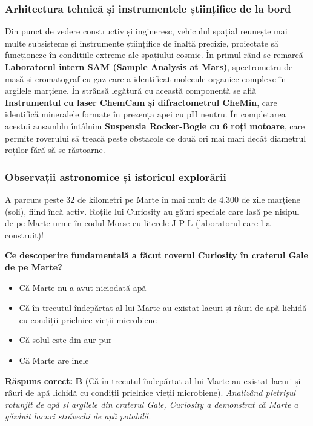 \subsubsection*{Arhitectura tehnică și instrumentele științifice de la bord}
Din punct de vedere constructiv și ingineresc, vehiculul spațial reunește mai multe subsisteme și instrumente științifice de înaltă precizie, proiectate să funcționeze în condițiile extreme ale spațiului cosmic. În primul rând se remarcă \textbf{Laboratorul intern SAM (Sample Analysis at Mars)}, spectrometru de masă și cromatograf cu gaz care a identificat molecule organice complexe în argilele marțiene. În strânsă legătură cu această componentă se află \textbf{Instrumentul cu laser ChemCam și difractometrul CheMin}, care identifică mineralele formate în prezența apei cu pH neutru. În completarea acestui ansamblu întâlnim \textbf{Suspensia Rocker-Bogie cu 6 roți motoare}, care permite roverului să treacă peste obstacole de două ori mai mari decât diametrul roților fără să se răstoarne.

\subsubsection*{Observații astronomice și istoricul explorării}
A parcurs peste 32 de kilometri pe Marte în mai mult de 4.300 de zile marțiene (soli), fiind încă activ. Roțile lui Curiosity au găuri speciale care lasă pe nisipul de pe Marte urme în codul Morse cu literele \guillemotleft{}J P L\guillemotright{} (laboratorul care l-a construit)!

\vspace{6pt}
\begin{tcolorbox}[orbitarquiz, title={\textbf{Întrebare de verificare \#54: Curiosity (Mars Science Laboratory)}}]
\textbf{Ce descoperire fundamentală a făcut roverul Curiosity în craterul Gale de pe Marte?}
\begin{itemize}[leftmargin=2.2em, itemsep=2pt, topsep=4pt]
  \item[$\square$ \textbf{A.}] Că Marte nu a avut niciodată apă
  \item[$\square$ \textbf{B.}] Că în trecutul îndepărtat al lui Marte au existat lacuri și râuri de apă lichidă cu condiții prielnice vieții microbiene
  \item[$\square$ \textbf{C.}] Că solul este din aur pur
  \item[$\square$ \textbf{D.}] Că Marte are inele
\end{itemize}
\vspace{2pt}
{\footnotesize\color{orbitarMuted}\textbf{Răspuns corect:} \textbf{B} (Că în trecutul îndepărtat al lui Marte au existat lacuri și râuri de apă lichidă cu condiții prielnice vieții microbiene). \emph{Analizând pietrișul rotunjit de apă și argilele din craterul Gale, Curiosity a demonstrat că Marte a găzduit lacuri străvechi de apă potabilă.}}
\end{tcolorbox}
\clearpage


